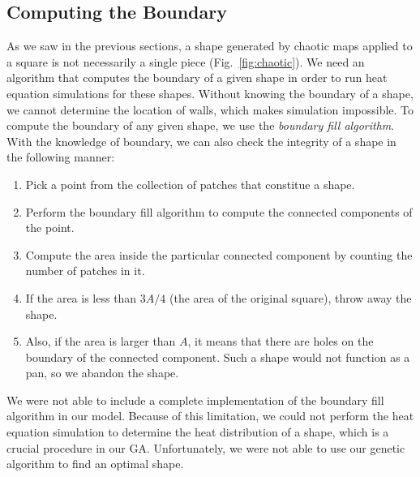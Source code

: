 \documentclass[12pt]{reedmcm}
\begin{document}
\subsection{Computing the Boundary}
As we saw in the previous sections, a shape generated by chaotic maps applied to a square is not necessarily a single piece (Fig.~\ref{fig:chaotic}).
We need an algorithm that computes the boundary of a given shape in order to run heat equation simulations for these shapes.
Without knowing the boundary of a shape, we cannot determine the location of walls, which makes simulation impossible.
To compute the boundary of any given shape, we use the \textit{boundary fill algorithm}.
With the knowledge of boundary, we can also check the integrity of a shape in the following manner:
\begin{enumerate}
  \item Pick a point from the collection of patches that constitue a shape.
  \item Perform the boundary fill algorithm to compute the connected components of the point.
  \item Compute the area inside the particular connected component by counting the number of patches in it.
  \item If the area is less than $3A/4$ (the area of the original square), throw away the shape.
  \item Also, if the area is larger than $A$, it means that there are holes on the boundary of the connected component. Such a shape would not function as a pan, so we abandon the shape.
\end{enumerate}
We were not able to include a complete implementation of the boundary fill algorithm in our model.
Because of this limitation, we could not perform the heat equation simulation to determine the heat distribution of a shape, which is a crucial procedure in our GA.
Unfortunately, we were not able to use our genetic algorithm to find an optimal shape.
\end{document}
